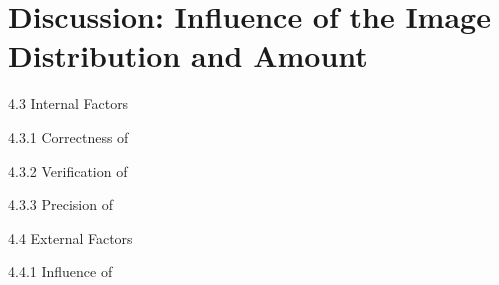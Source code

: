 \section{Discussion: Influence of the Image Distribution and Amount}
\label{sec:discussion-ImageDistributionAmount}





4.3 Internal Factors

4.3.1 Correctness of

4.3.2 Verification of

4.3.3 Precision of


4.4 External Factors

4.4.1 Influence of 

